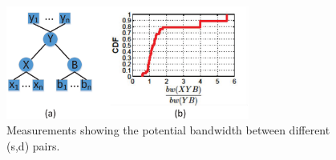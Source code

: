 
\begin{figure}[t]
\centering
\includegraphics[width=80mm]{images/potential.eps}%
\caption{Measurements showing the potential bandwidth between different (s,d) pairs.}
\label{fig:case:size}
\vspace{-0.4cm}
\end{figure}

